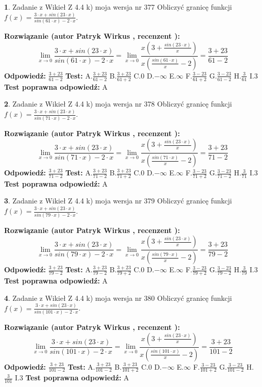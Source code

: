 \documentclass[12pt, a4paper]{article}
\theoremstyle{definition} %
\newtheorem{zad}{}
\newcommand{\zadStart}[1]{\begin{zad}#1\newline}
\newcommand{\zadStop}{\end{zad}}
\newcommand{\rozwStart}[2]{\noindent \textbf{Rozwiązanie (autor #1 , recenzent #2): }\newline}
\newcommand{\rozwStop}{\newline}
\newcommand{\odpStart}{\noindent \textbf{Odpowiedź:}\newline}
\newcommand{\odpStop}{\newline}
\newcommand{\testStart}{\noindent \textbf{Test:}\newline}
\newcommand{\testStop}{\newline}
\newcommand{\kluczStart}{\noindent \textbf{Test poprawna odpowiedź:}\newline}
\newcommand{\kluczStop}{\newline}
\begin{document}
\zadStart{Zadanie z Wikieł Z 4.4 k) moja wersja nr 377}
Obliczyć granicę funkcji $f(x)=\frac{3\cdot x +sin(23\cdot x)}{sin(61\cdot x) -2\cdot x}$.
\zadStop
\rozwStart{Patryk Wirkus}{}
$$\lim\limits_{x\to 0}\frac{3\cdot x +sin(23\cdot x)}{sin(61\cdot x) -2\cdot x}
=\lim\limits_{x\to 0}\frac{x(3+\frac{sin(23\cdot x)}{x})}{x(\frac{sin(61\cdot x)}{x}-2)}
=\frac{3+23}{61-2}$$
\rozwStop
\odpStart
$\frac{3+23}{61-2}$
\odpStop
\testStart
A.$\frac{3+23}{61-2}$
B.$\frac{3+23}{61+2}$
C.$0$
D.$-\infty$
E.$\infty$
F.$\frac{3-23}{61+2}$
G.$\frac{3-23}{61-2}$
H.$\frac{3}{61}$
I.$3$
\testStop
\kluczStart
A
\kluczStop



\zadStart{Zadanie z Wikieł Z 4.4 k) moja wersja nr 378}
Obliczyć granicę funkcji $f(x)=\frac{3\cdot x +sin(23\cdot x)}{sin(71\cdot x) -2\cdot x}$.
\zadStop
\rozwStart{Patryk Wirkus}{}
$$\lim\limits_{x\to 0}\frac{3\cdot x +sin(23\cdot x)}{sin(71\cdot x) -2\cdot x}
=\lim\limits_{x\to 0}\frac{x(3+\frac{sin(23\cdot x)}{x})}{x(\frac{sin(71\cdot x)}{x}-2)}
=\frac{3+23}{71-2}$$
\rozwStop
\odpStart
$\frac{3+23}{71-2}$
\odpStop
\testStart
A.$\frac{3+23}{71-2}$
B.$\frac{3+23}{71+2}$
C.$0$
D.$-\infty$
E.$\infty$
F.$\frac{3-23}{71+2}$
G.$\frac{3-23}{71-2}$
H.$\frac{3}{71}$
I.$3$
\testStop
\kluczStart
A
\kluczStop



\zadStart{Zadanie z Wikieł Z 4.4 k) moja wersja nr 379}
Obliczyć granicę funkcji $f(x)=\frac{3\cdot x +sin(23\cdot x)}{sin(79\cdot x) -2\cdot x}$.
\zadStop
\rozwStart{Patryk Wirkus}{}
$$\lim\limits_{x\to 0}\frac{3\cdot x +sin(23\cdot x)}{sin(79\cdot x) -2\cdot x}
=\lim\limits_{x\to 0}\frac{x(3+\frac{sin(23\cdot x)}{x})}{x(\frac{sin(79\cdot x)}{x}-2)}
=\frac{3+23}{79-2}$$
\rozwStop
\odpStart
$\frac{3+23}{79-2}$
\odpStop
\testStart
A.$\frac{3+23}{79-2}$
B.$\frac{3+23}{79+2}$
C.$0$
D.$-\infty$
E.$\infty$
F.$\frac{3-23}{79+2}$
G.$\frac{3-23}{79-2}$
H.$\frac{3}{79}$
I.$3$
\testStop
\kluczStart
A
\kluczStop



\zadStart{Zadanie z Wikieł Z 4.4 k) moja wersja nr 380}
Obliczyć granicę funkcji $f(x)=\frac{3\cdot x +sin(23\cdot x)}{sin(101\cdot x) -2\cdot x}$.
\zadStop
\rozwStart{Patryk Wirkus}{}
$$\lim\limits_{x\to 0}\frac{3\cdot x +sin(23\cdot x)}{sin(101\cdot x) -2\cdot x}
=\lim\limits_{x\to 0}\frac{x(3+\frac{sin(23\cdot x)}{x})}{x(\frac{sin(101\cdot x)}{x}-2)}
=\frac{3+23}{101-2}$$
\rozwStop
\odpStart
$\frac{3+23}{101-2}$
\odpStop
\testStart
A.$\frac{3+23}{101-2}$
B.$\frac{3+23}{101+2}$
C.$0$
D.$-\infty$
E.$\infty$
F.$\frac{3-23}{101+2}$
G.$\frac{3-23}{101-2}$
H.$\frac{3}{101}$
I.$3$
\testStop
\kluczStart
A
\kluczStop
\end{document}
